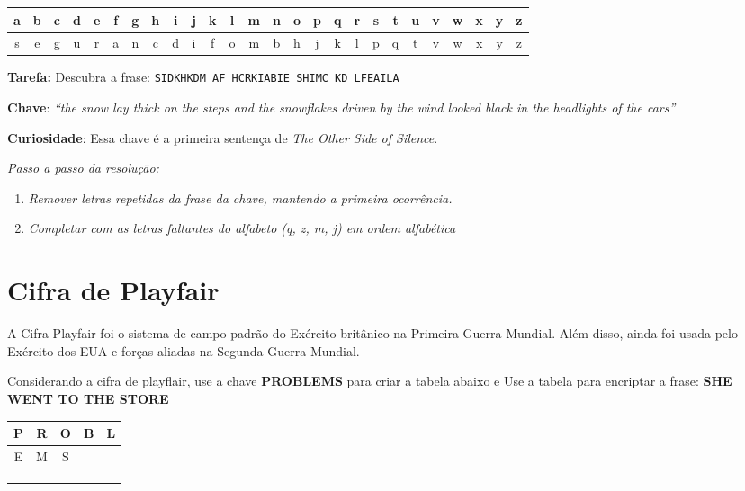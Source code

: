 \begin{table}[h]
    \centering
    \begin{tabular}{|*{26}{c|}}
        \hline
        a & b & c & d & e & f & g & h & i & j & k & l & m & n & o & p & q & r & s & t & u & v & w & x & y & z \\
        \hline
        s & e & g & u & r & a & n & c & d & i & f & o & m & b & h & j & k & l & p & q & t & v & w & x & y & z \\
        \hline
    \end{tabular}
\end{table}

\medskip
\textbf{Tarefa:}
Descubra a frase: \texttt{SIDKHKDM AF HCRKIABIE SHIMC KD LFEAILA}


\textbf{Chave}: \emph{``the snow lay thick on the steps and the snowflakes driven by the wind looked black in the headlights of the cars''}

\textbf{Curiosidade}: Essa chave é a primeira sentença de \textit{The Other Side of Silence}.

\textit{Passo a passo da resolução:}
\begin{enumerate}

    \item \textit{Remover letras repetidas da frase da chave, mantendo a primeira ocorrência.}

    \item \textit{Completar com as letras faltantes do alfabeto (q, z, m, j) em ordem alfabética}


\end{enumerate}




\section{Cifra de Playfair}

A Cifra Playfair foi o sistema de campo padrão do Exército britânico na Primeira Guerra Mundial. Além disso, ainda foi usada pelo Exército dos EUA e forças aliadas na Segunda Guerra Mundial.

Considerando a cifra de playflair, use a chave \textbf{PROBLEMS} para criar a tabela abaixo e Use a tabela para encriptar a frase: \textbf{SHE WENT TO THE STORE}




\begin{tabular}{|c|c|c|c|c|}
    \hline
    P & R & O & B & L \\
    \hline
    E & M & S &   &   \\
    \hline
      &   &   &   &   \\
    \hline
      &   &   &   &   \\
    \hline
      &   &   &   &   \\
    \hline
\end{tabular}




